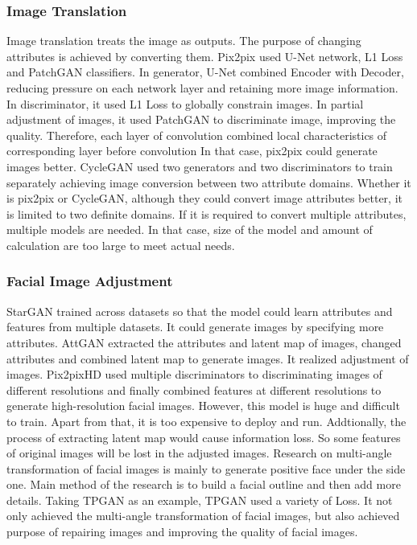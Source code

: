 \subsubsection*{Image Translation}
Image translation treats the image as outputs.
 The purpose of changing attributes is achieved by converting them.
Pix2pix used U-Net network, L1 Loss and PatchGAN classifiers.
In generator, U-Net combined Encoder with Decoder,
    reducing pressure on each network layer and retaining more image information.
In discriminator, it used L1 Loss to globally constrain images.
In partial adjustment of images,
    it used PatchGAN to discriminate image, improving the quality.
Therefore, each layer of convolution combined local characteristics of corresponding layer before convolution
    In that case, pix2pix could generate images better.
CycleGAN used two generators and two discriminators to train separately achieving image conversion between two attribute domains.
Whether it is pix2pix or CycleGAN,
    although they could convert image attributes better,
    it is limited to two definite domains.
If it is required to convert multiple attributes, multiple models are needed.
In that case, size of the model and amount of calculation are too large to meet actual needs.

\subsubsection*{Facial Image Adjustment}
StarGAN trained across datasets so that the model could learn attributes and features from multiple datasets.
 It could generate images by specifying more attributes.
AttGAN extracted the attributes and latent map of images,
    changed attributes and combined latent map to generate images.
    It realized adjustment of images.
Pix2pixHD used multiple discriminators to discriminating images of different resolutions
    and finally combined features at different resolutions to generate high-resolution facial images.
However, this model is huge and difficult to train.
Apart from that, it is too expensive to deploy and run.
Addtionally, the process of extracting latent map would cause information loss.
So some features of original images will be lost in the adjusted images.
Research on multi-angle transformation of facial images is mainly to generate positive face under the side one.
Main method of the research is to build a facial outline and then add more details.
Taking TPGAN as an example, TPGAN used a variety of Loss.
    It not only achieved the multi-angle transformation of facial images,
    but also achieved purpose of repairing images and improving the quality of facial images.

